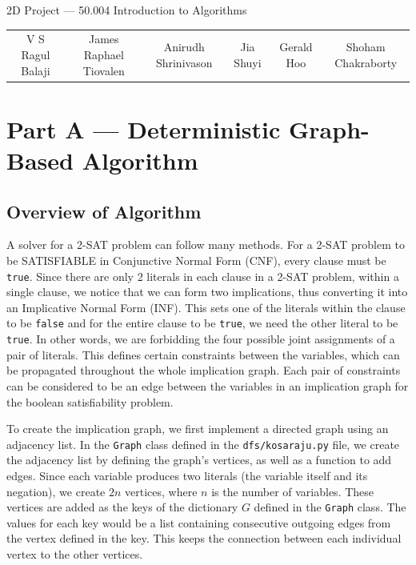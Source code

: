 \documentclass[11pt,fancychapters]{article}
\begin{document}
\centerline{\huge{2D Project --- 50.004 Introduction to Algorithms}}

\begin{table}[ht]
\centering
\footnotesize
 \begin{tabular}{c c c c c c} 
V S Ragul Balaji&James Raphael Tiovalen&Anirudh Shrinivason&Jia Shuyi&Gerald Hoo&Shoham Chakraborty
 \end{tabular}
\end{table}

\section{Part A --- Deterministic Graph-Based Algorithm}
\subsection{Overview of Algorithm}

A solver for a 2-SAT problem can follow many methods. For a 2-SAT problem to be SATISFIABLE in Conjunctive Normal Form (CNF), every clause must be \texttt{true}. Since there are only 2 literals in each clause in a 2-SAT problem, within a single clause, we notice that we can form two implications, thus converting it into an Implicative Normal Form (INF). This sets one of the literals within the clause to be \texttt{false} and for the entire clause to be \texttt{true}, we need the other literal to be \texttt{true}. In other words, we are forbidding the four possible joint assignments of a pair of literals. This defines certain constraints between the variables, which can be propagated throughout the whole implication graph. Each pair of constraints can be considered to be an edge between the variables in an implication graph for the boolean satisfiability problem.\newline

To create the implication graph, we first implement a directed graph using an adjacency list. In the \texttt{Graph} class defined in the \texttt{dfs/kosaraju.py} file, we create the adjacency list by defining the graph's vertices, as well as a function to add edges. Since each variable produces two literals (the variable itself and its negation), we create $2n$ vertices, where $n$ is the number of variables. These vertices are added as the keys of the dictionary $G$ defined in the \texttt{Graph} class. The values for each key would be a list containing consecutive outgoing edges from the vertex defined in the key. This keeps the connection between each individual vertex to the other vertices.
\end{document}
